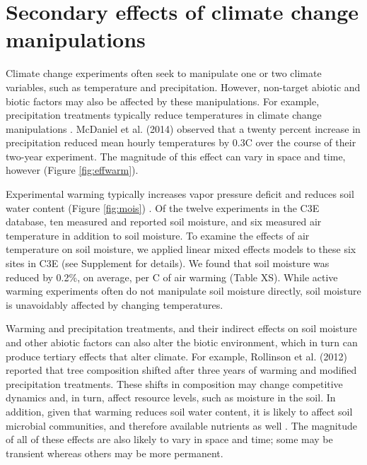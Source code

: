 \documentclass{article}
\begin{document}
\section* {Secondary effects of climate change manipulations} %
Climate change experiments often seek to manipulate one or two climate variables, such as temperature and precipitation. However, non-target abiotic and biotic factors may also be affected by these manipulations. For example, precipitation treatments typically reduce temperatures in climate change manipulations \citep{sherry2007,rollinson2012,mcdaniel2014}. McDaniel et al. (2014) observed that a twenty percent increase in precipitation reduced mean hourly temperatures by 0.3\degree C over the course of their two-year experiment. The magnitude of this effect can vary in space and time, however (Figure \ref{fig:effwarm}). 
\par Experimental warming typically increases vapor pressure deficit and reduces soil water content (Figure \ref{fig:mois}) \citep[e.g.,][]{sherry2007,morin2010,templer2016}. Of the twelve experiments in the C3E database, ten measured and reported soil moisture, and six measured air temperature in addition to soil moisture. %
To examine the effects of air temperature on soil moisture, we applied linear mixed effects models to these six sites in C3E (see Supplement for details). We found that soil moisture was reduced by 0.2\%, on average, per \degree C of air warming (Table XS). While active warming experiments often do not manipulate soil moisture directly, soil moisture is unavoidably affected by changing temperatures. 
\par Warming and precipitation treatments, and their indirect effects on soil moisture and other abiotic factors can also alter the biotic environment, which in turn can produce tertiary effects that alter climate. For example, Rollinson et al. (2012) reported that tree composition shifted after three years of warming and modified precipitation treatments. These shifts in composition may change competitive dynamics and, in turn, affect resource levels, such as moisture in the soil. In addition, given that warming reduces soil water content, it is likely to affect soil microbial communities, and therefore available nutrients as well \citep{mcdaniel2014,mcdaniel2014b}. The magnitude of all of these effects are also likely to vary in space and time; some may be transient whereas others may be more permanent. %
\end{document}
